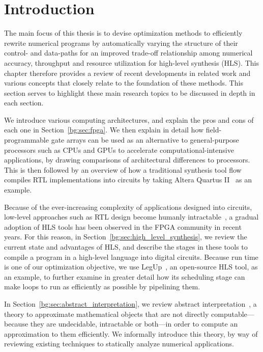 \section{Introduction}
\label{bg:sec:introduction}

The main focus of this thesis is to devise optimization methods to efficiently
rewrite numerical programs by automatically varying the structure of their
control- and data-paths for an improved trade-off relationship among numerical
accuracy, throughput and resource utilization for high-level synthesis (HLS).
This chapter therefore provides a review of recent developments in related work
and various concepts that closely relate to the foundation of these methods.
This section serves to highlight these main research topics to be discussed in
depth in each section.

We introduce various computing architectures, and explain the pros and cons
of each one in Section~\ref{bg:sec:fpga}.  We then explain in detail how
field-programmable gate arrays can be used as an alternative to general-purpose
processors such as CPUs and GPUs to accelerate computational-intensive
applications, by drawing comparisons of architectural differences to
processors.  This is then followed by an overview of how a traditional
synthesis tool flow compiles RTL implementations into circuits by taking Altera
Quartus II~\cite{quartus} as an example.

Because of the ever-increasing complexity of applications designed
into circuits, low-level approaches such as RTL design become humanly
intractable~\cite{gajski}, a gradual adoption of HLS tools has been
observed in the FPGA community in recent years.  For this reason, in
Section~\ref{bg:sec:high_level_synthesis}, we review the current state and
advantages of HLS, and describe the stages in these tools to compile a program
in a high-level language into digital circuits.  Because run time is one of our
optimization objective, we use LegUp~\cite{legup}, an open-source HLS tool, as
an example, to further examine in greater detail how its scheduling stage can
make loops to run as efficiently as possible by pipelining them.

In Section~\ref{bg:sec:abstract_interpretation}, we review abstract
interpretation~\cite{cousot77}, a theory to approximate mathematical objects
that are not directly computable---because they are undecidable, intractable or
both---in order to compute an approximation to them efficiently.  We informally
introduce this theory, by way of reviewing existing techniques to statically
analyze numerical applications.

